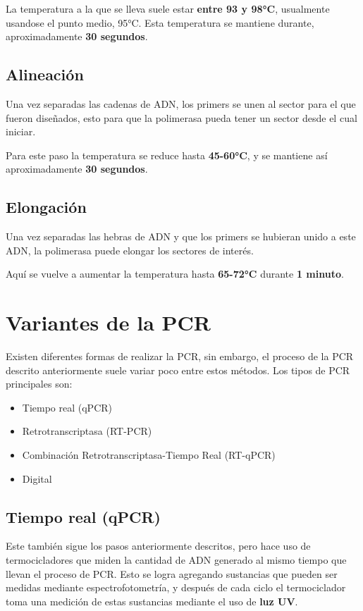 La temperatura a la que se lleva suele estar \textbf{entre 93 y 98°C}, usualmente usandose el punto medio, 95°C. Esta temperatura se mantiene durante, aproximadamente \textbf{30 segundos}.

\subsection{Alineación}

Una vez separadas las cadenas de ADN, los primers se unen al sector para el que fueron diseñados, esto para que la polimerasa pueda tener un sector desde el cual iniciar.

Para este paso la temperatura se reduce hasta \textbf{45-60°C}, y se mantiene así aproximadamente \textbf{30 segundos}.

\subsection{Elongación}

Una vez separadas las hebras de ADN y que los primers se hubieran unido a este ADN, la polimerasa puede elongar los sectores de interés.

Aquí se vuelve a aumentar la temperatura hasta \textbf{65-72°C} durante \textbf{1 minuto}.

\section{Variantes de la PCR}

Existen diferentes formas de realizar la PCR, sin embargo, el proceso de la PCR descrito anteriormente suele variar poco entre estos métodos. Los tipos de PCR principales son:

\begin{itemize}
    \item Tiempo real (qPCR)
    \item Retrotranscriptasa (RT-PCR)
    \item Combinación Retrotranscriptasa-Tiempo Real (RT-qPCR)
    \item Digital
\end{itemize}

\subsection{Tiempo real (qPCR)}

Este también sigue los pasos anteriormente descritos, pero hace uso de termocicladores que miden la cantidad de ADN generado al mismo tiempo que llevan el proceso de PCR.
Esto se logra agregando sustancias que pueden ser medidas mediante espectrofotometría, y después de cada ciclo el termociclador toma una medición de estas sustancias mediante el uso de \textbf{luz UV}.

